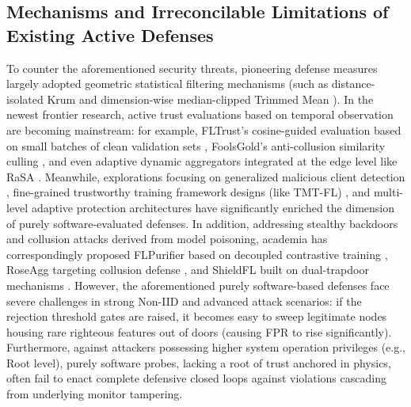 \documentclass[runningheads]{llncs}
\begin{document}
\subsection{Mechanisms and Irreconcilable Limitations of Existing Active Defenses}
To counter the aforementioned security threats, pioneering defense measures largely adopted geometric statistical filtering mechanisms (such as distance-isolated Krum \cite{blanchard2017krum} and dimension-wise median-clipped Trimmed Mean \cite{yin2018byzantine}). In the newest frontier research, active trust evaluations based on temporal observation are becoming mainstream: for example, FLTrust's cosine-guided evaluation based on small batches of clean validation sets \cite{cao2021fltrust}, FoolsGold's anti-collusion similarity culling \cite{fung2020foolsgold}, and even adaptive dynamic aggregators integrated at the edge level like RaSA \cite{wang2025rasa}. Meanwhile, explorations focusing on generalized malicious client detection \cite{dou2025toward}, fine-grained trustworthy training framework designs (like TMT-FL) \cite{lu2025tmt}, and multi-level adaptive protection architectures \cite{wang2024federated} have significantly enriched the dimension of purely software-evaluated defenses. In addition, addressing stealthy backdoors and collusion attacks derived from model poisoning, academia has correspondingly proposed FLPurifier based on decoupled contrastive training \cite{flpurifier}, RoseAgg targeting collusion defense \cite{roseagg}, and ShieldFL built on dual-trapdoor mechanisms \cite{shieldfl}.
However, the aforementioned purely software-based defenses face severe challenges in strong Non-IID and advanced attack scenarios: if the rejection threshold gates are raised, it becomes easy to sweep legitimate nodes housing rare righteous features out of doors (causing FPR to rise significantly). Furthermore, against attackers possessing higher system operation privileges (e.g., Root level), purely software probes, lacking a root of trust anchored in physics, often fail to enact complete defensive closed loops against violations cascading from underlying monitor tampering.
\end{document}
